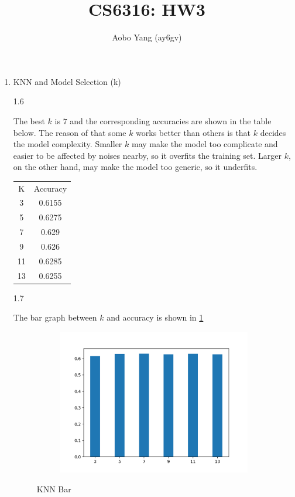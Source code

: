 \documentclass[11pt]{article}
\begin{document}
\author{Aobo Yang (ay6gv)}
\title{CS6316: HW3}
\maketitle

\medskip

\begin{enumerate}

\item
KNN and Model Selection (k)

1.6
\medskip

The best $k$ is $7$ and the corresponding accuracies are shown in the table below. The reason of that some $k$ works better than others is that $k$ decides the model complexity. Smaller $k$ may make the model too complicate and easier to be affected by noises nearby, so it overfits the training set. Larger $k$, on the other hand, may make the model too generic, so it underfits.

\begin{center}
  \begin{tabular}{ |c|c| }
   \hline
   K & Accuracy \\
   3 & 0.6155 \\
   5 & 0.6275 \\
   7 & 0.629 \\
   9 & 0.626 \\
   11 & 0.6285 \\
   13 & 0.6255 \\
   \hline
  \end{tabular}
\end{center}

1.7
\medskip

The bar graph between $k$ and accuracy is shown in \ref{fig:knn_bar}

\begin{figure}[!h]
  \centering
  \begin{subfigure}[b]{0.4\linewidth}
    \includegraphics[width=\linewidth]{figures/knn_bar.png}
  \end{subfigure}
  \caption{KNN Bar}
  \label{fig:knn_bar}
\end{figure}



\end{enumerate}
\end{document}
